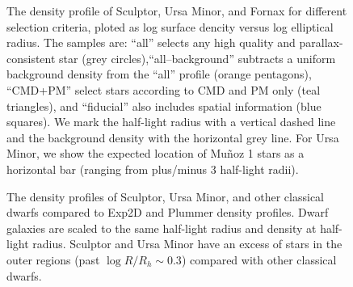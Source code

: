 \begin{figure}
\centering
{}
\caption[Sculptor density profiles]{The density profile of Sculptor,
Ursa Minor, and Fornax for different selection criteria, ploted as log
surface dencity versus log elliptical radius. The samples are: ``all''
selects any high quality and parallax-consistent star (grey
circles),``all--background'' subtracts a uniform background density from
the ``all'' profile (orange pentagons), ``CMD+PM'' select stars
according to CMD and PM only (teal triangles), and ``fiducial'' also
includes spatial information (blue squares). We mark the half-light
radius with a vertical dashed line and the background density with the
horizontal grey line. For Ursa Minor, we show the expected location of
Muñoz 1 stars as a horizontal bar (ranging from plus/minus 3 half-light
radii).}\label{fig:scl_observed_profiles}
\end{figure}

\begin{figure}
\centering
{}
\caption[Classical dwarf density profiles]{The density profiles of
Sculptor, Ursa Minor, and other classical dwarfs compared to Exp2D and
Plummer density profiles. Dwarf galaxies are scaled to the same
half-light radius and density at half-light radius. Sculptor and Ursa
Minor have an excess of stars in the outer regions (past
\(\log R/R_h \sim 0.3\)) compared with other classical
dwarfs.}\label{fig:classical_dwarfs_densities}
\end{figure}
